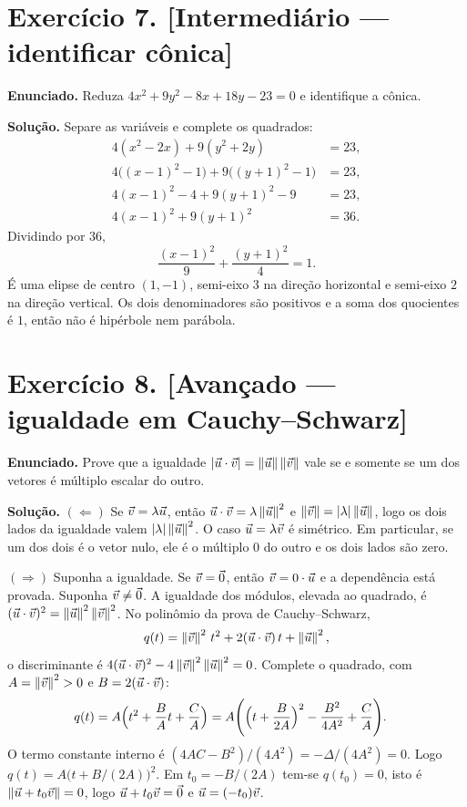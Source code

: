 \documentclass[11pt,a4paper]{article}
\begin{document}
\section*{Exercício 7. [Intermediário --- identificar cônica]}

\textbf{Enunciado.} Reduza $4x^2+9y^2-8x+18y-23=0$ e identifique a cônica.

\textbf{Solução.}
Separe as variáveis e complete os quadrados:
\begin{align*}
4(x^2-2x)+9(y^2+2y)&=23,\\
4\bigl((x-1)^2-1\bigr)+9\bigl((y+1)^2-1\bigr)&=23,\\
4(x-1)^2-4+9(y+1)^2-9&=23,\\
4(x-1)^2+9(y+1)^2&=36.
\end{align*}
Dividindo por $36$,
\[
\frac{(x-1)^2}{9}+\frac{(y+1)^2}{4}=1.
\]
É uma elipse de centro $(1,-1)$, semi-eixo $3$ na direção horizontal e semi-eixo $2$ na direção vertical. Os dois denominadores são positivos e a soma dos quocientes é $1$, então não é hipérbole nem parábola.

\section*{Exercício 8. [Avançado --- igualdade em Cauchy--Schwarz]}

\textbf{Enunciado.} Prove que a igualdade $\left\lvert \vec{u}\cdot\vec{v} \right\rvert=\left\lVert \vec{u} \right\rVert\left\lVert \vec{v} \right\rVert$ vale se e somente se um dos vetores é múltiplo escalar do outro.

\textbf{Solução.}
$(\Leftarrow)$ Se $\vec{v}=\lambda\vec{u}$, então $\vec{u}\cdot\vec{v}=\lambda\left\lVert \vec{u} \right\rVert^2$ e $\left\lVert \vec{v} \right\rVert=\left\lvert \lambda \right\rvert\left\lVert \vec{u} \right\rVert$, logo os dois lados da igualdade valem $\left\lvert \lambda \right\rvert\left\lVert \vec{u} \right\rVert^2$. O caso $\vec{u}=\lambda\vec{v}$ é simétrico. Em particular, se um dos dois é o vetor nulo, ele é o múltiplo $0$ do outro e os dois lados são zero.

$(\Rightarrow)$ Suponha a igualdade. Se $\vec{v}=\vec{0}$, então $\vec{v}=0\cdot\vec{u}$ e a dependência está provada. Suponha $\vec{v}\neq\vec{0}$. A igualdade dos módulos, elevada ao quadrado, é $(\vec{u}\cdot\vec{v})^2=\left\lVert \vec{u} \right\rVert^2\left\lVert \vec{v} \right\rVert^2$. No polinômio da prova de Cauchy--Schwarz,
\[
q(t)=\left\lVert \vec{v} \right\rVert^2\, t^2+2(\vec{u}\cdot\vec{v})\, t+\left\lVert \vec{u} \right\rVert^2,
\]
o discriminante é $4(\vec{u}\cdot\vec{v})^2-4\left\lVert \vec{v} \right\rVert^2\left\lVert \vec{u} \right\rVert^2=0$. Complete o quadrado, com $A=\left\lVert \vec{v} \right\rVert^2>0$ e $B=2(\vec{u}\cdot\vec{v})$:
\begin{align*}
q(t)
&=A\Bigl(t^2+\frac{B}{A}t+\frac{C}{A}\Bigr)
=A\Biggl(\Bigl(t+\frac{B}{2A}\Bigr)^2-\frac{B^2}{4A^2}+\frac{C}{A}\Biggr).
\end{align*}
O termo constante interno é $(4AC-B^2)/(4A^2)=-\Delta/(4A^2)=0$. Logo $q(t)=A\bigl(t+B/(2A)\bigr)^2$. Em $t_0=-B/(2A)$ tem-se $q(t_0)=0$, isto é $\left\lVert \vec{u}+t_0\vec{v} \right\rVert=0$, logo $\vec{u}+t_0\vec{v}=\vec{0}$ e $\vec{u}=(-t_0)\vec{v}$.
\end{document}
